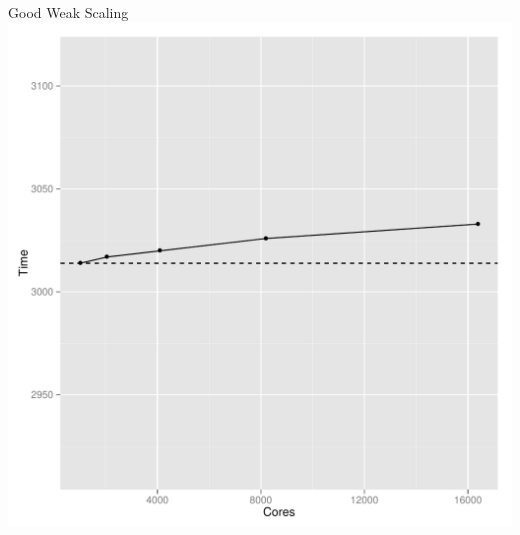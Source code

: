 \begin{frame}
\begin{center}
\begin{minipage}{.475\textwidth}
\begin{block}{Good Weak Scaling}
      \includegraphics[width=.95\textwidth]{../common/pics/scaling_weak}
    \end{block}
    \end{minipage}
    \end{center}
\end{frame}



